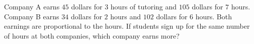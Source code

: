 Company A earns $45$ dollars for $3$ hours of tutoring and $105$ dollars for $7$ hours. Company B earns $34$ dollars for $2$ hours and $102$ dollars for $6$ hours. Both earnings are proportional to the hours. If students sign up for the same number of hours at both companies, which company earns more?
